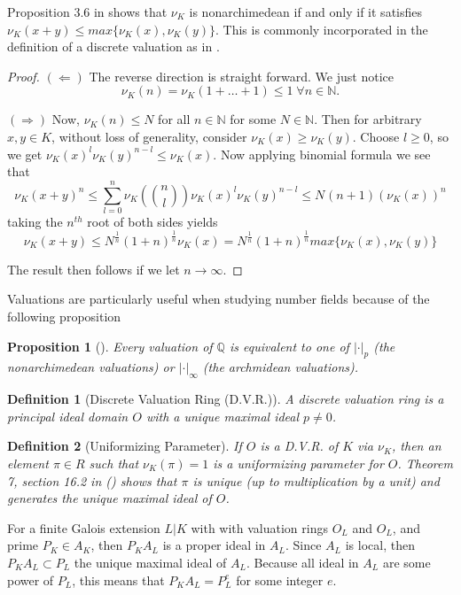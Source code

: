 \documentclass[paper=a4, fontsize=11pt]{scrartcl} %
\numberwithin{equation}{section} %
\numberwithin{figure}{section} %
\numberwithin{table}{section} %
\theoremstyle{break}
\newtheorem{defn}{Definition}
\newtheorem{prop}{Proposition}
\begin{document}
Proposition 3.6 in \cite{Neukirch} shows that $\nu_K$ is nonarchimedean if and only if it satisfies $\nu_{K}(x+y) \leq max\{\nu_K(x),\nu_K(y)\}$. This is commonly incorporated in the definition of a discrete valuation as in \cite{DnF}. 
\begin{proof}

$(\Leftarrow)$ The reverse direction is straight forward. We just notice 
$$\nu_K(n)=\nu_K(1+\ldots+1) \leq 1\; \forall n\in\mathbb{N}.$$

$(\Rightarrow)$ Now, $\nu_K(n) \leq N$ for all $n\in\mathbb{N}$ for some $N \in \mathbb{N}$. Then for arbitrary $x,y\in K$, without loss of generality, consider $\nu_K(x) \geq \nu_K(y)$. Choose $l \geq 0$, so we get $\nu_K(x)^{l}\nu_K(y)^{n-l} \leq \nu_K(x)$. Now applying binomial formula we see that
$$
	\nu_K(x+y)^{n} \leq \sum_{l=0}^{n} \nu_K({{n}\choose{l}}) \nu_K(x)^l \nu_K(y)^{n-l} \leq N^{}(n+1)(\nu_K(x))^n
$$
taking the $n^{th}$ root of both sides yields
$$
\nu_K(x+y) \leq N^{\frac{1}{n}}(1+n)^{\frac{1}{n}} \nu_K(x) = N^{\frac{1}{n}}(1+n)^{\frac{1}{n}} max\{\nu_K(x), \nu_K(y) \}
$$

The result then follows if we let $n \to \infty$.
\end{proof}

Valuations are particularly useful when studying number fields because of the following proposition
\begin{prop}[\cite{Serre}]
Every valuation of $\mathbb{Q}$ is equivalent to one of $|\cdot|_p$ (the nonarchimedean valuations) or $|\cdot|_\infty$ (the archmidean valuations).
\end{prop}


\begin{defn}[Discrete Valuation Ring (D.V.R.)]
A discrete valuation ring is a principal ideal domain $O$ with a unique maximal ideal $p \not= 0$.
\end{defn}
\begin{defn}[Uniformizing Parameter]
If $O$ is a D.V.R. of $K$ via $\nu_K$, then an element $\pi \in R$ such that $\nu_K(\pi) = 1$ is a uniformizing parameter for $O$. Theorem 7, section 16.2 in (\cite{DnF}) shows that $\pi$ is unique (up to multiplication by a unit) and generates the unique maximal ideal of $O$.
\end{defn}

For a finite Galois extension $L|K$ with with valuation rings $O_L$ and $O_L$, and prime $P_K\in A_K$, then $P_K A_L$ is a proper ideal in $A_L$. Since $A_L$ is local, then $P_K A_L \subset P_L$ the unique maximal ideal of $A_L$. Because all ideal in $A_L$ are some power of $P_L$, this means that $P_K A_L = P_L^e$ for some integer $e$.
\end{document}
